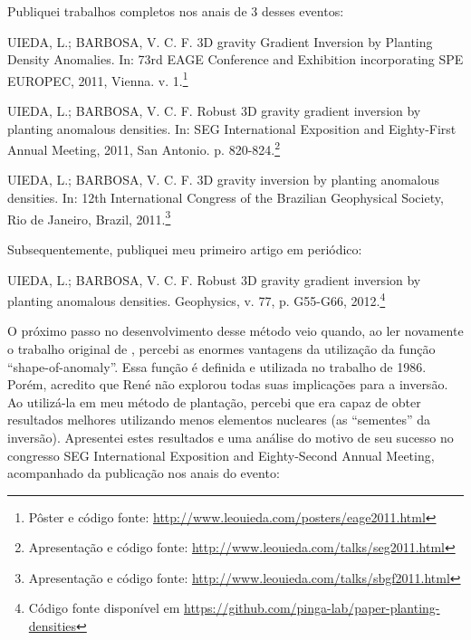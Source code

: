 Publiquei trabalhos completos nos anais de 3 desses eventos:

\begin{displayquote}
    UIEDA, L.; BARBOSA, V. C. F. 3D gravity Gradient Inversion by Planting
    Density Anomalies. In: 73rd EAGE Conference and Exhibition incorporating
    SPE EUROPEC, 2011, Vienna. v. 1.\footnote{Pôster e código fonte:
    \url{http://www.leouieda.com/posters/eage2011.html}}
\end{displayquote}

\begin{displayquote}
    UIEDA, L.; BARBOSA, V. C. F. Robust 3D gravity gradient
    inversion by planting anomalous densities. In: SEG International Exposition
    and Eighty-First Annual Meeting, 2011, San Antonio. p.
    820-824.\footnote{Apresentação e código fonte:
    \url{http://www.leouieda.com/talks/seg2011.html}}
\end{displayquote}

\begin{displayquote}
    UIEDA, L.; BARBOSA, V. C. F. 3D gravity inversion by planting
    anomalous densities. In: 12th International Congress of the Brazilian
    Geophysical Society, Rio de Janeiro, Brazil,
    2011.\footnote{Apresentação e código fonte:
    \url{http://www.leouieda.com/talks/sbgf2011.html}}
\end{displayquote}

Subsequentemente, publiquei meu primeiro artigo em periódico:

\begin{displayquote}
    UIEDA, L.; BARBOSA, V. C. F. Robust 3D gravity gradient inversion by
    planting anomalous densities. Geophysics, v. 77, p. G55-G66,
    2012.\footnote{Código fonte disponível em
    \url{https://github.com/pinga-lab/paper-planting-densities}}
\end{displayquote}

O próximo passo no desenvolvimento desse método veio quando, ao ler novamente o
trabalho original de \citet{rene}, percebi as enormes vantagens da utilização
da função ``shape-of-anomaly''.
Essa função é definida e utilizada no trabalho de 1986.
Porém, acredito que René não explorou todas suas implicações para a inversão.
Ao utilizá-la em meu método de plantação, percebi que era capaz de obter
resultados melhores utilizando menos elementos nucleares (as ``sementes'' da
inversão).
Apresentei estes resultados e uma análise do motivo de seu sucesso no congresso
SEG International Exposition and Eighty-Second Annual Meeting,
acompanhado da publicação nos anais do evento:

